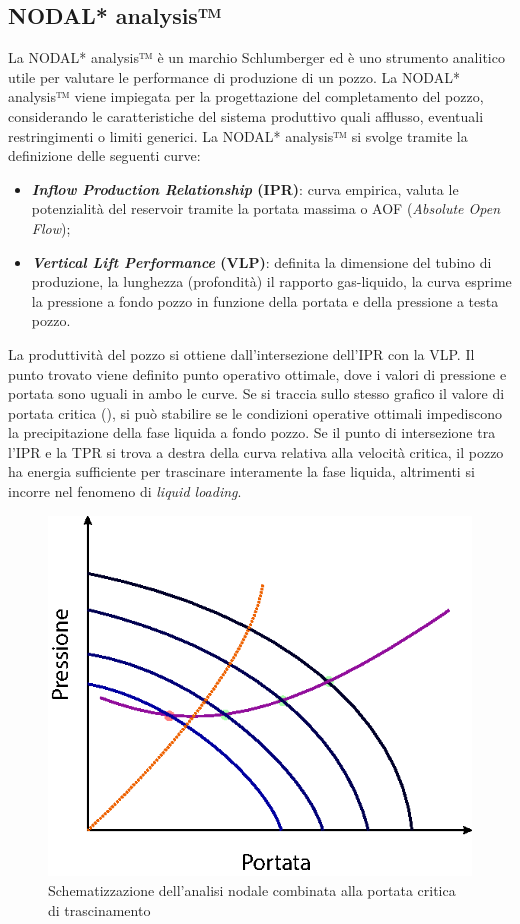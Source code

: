 \subsection{NODAL* analysis™}
La NODAL* analysis™ è un marchio Schlumberger ed è uno strumento analitico utile per valutare le performance di produzione di un pozzo. La NODAL* analysis™ viene impiegata per la progettazione del completamento del pozzo, considerando le caratteristiche del sistema produttivo quali afflusso, eventuali restringimenti o limiti generici. La NODAL* analysis™ si svolge tramite la definizione delle seguenti curve:
\begin{itemize}
    \item \textbf{\textit{Inflow Production Relationship} (IPR)}: curva empirica, valuta le potenzialità del reservoir tramite la portata massima o AOF (\textit{Absolute Open Flow});
    \item \textbf{\textit{Vertical Lift Performance} (VLP)}: definita la dimensione del tubino di produzione, la lunghezza (profondità) il rapporto gas-liquido, la curva esprime la pressione a fondo pozzo in funzione della portata e della pressione a testa pozzo. 
\end{itemize}
La produttività del pozzo si ottiene dall'intersezione dell'IPR con la VLP. Il punto trovato viene definito punto operativo ottimale, dove i valori di pressione e portata sono uguali in ambo le curve. Se si traccia sullo stesso grafico il valore di portata critica (), si può stabilire se le condizioni operative ottimali impediscono la precipitazione della fase liquida a fondo pozzo. Se il punto di intersezione tra l'IPR e la TPR si trova a destra della curva relativa alla velocità critica, il pozzo ha energia sufficiente per trascinare interamente la fase liquida, altrimenti si incorre nel fenomeno di \textit{liquid loading}.

\begin{figure}[htbp]
    \centering
    \includegraphics[width=.5\textwidth]{fig/foamer/ipr-tpr.eps}
    \caption{Schematizzazione dell'analisi nodale combinata alla portata critica di trascinamento}
    \label{fig:ipr-tpr}
\end{figure}


